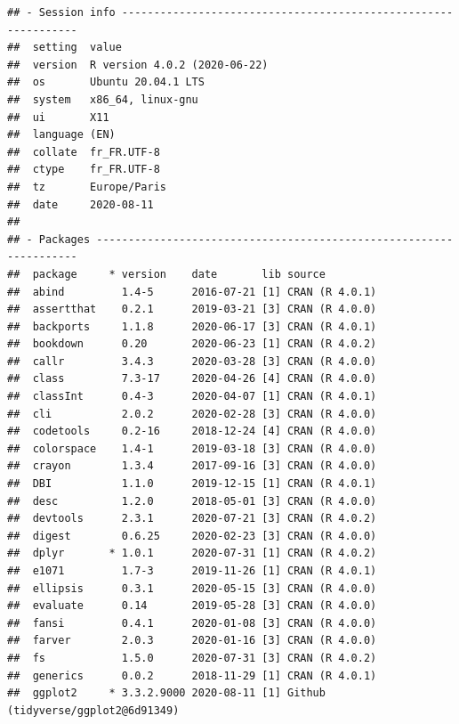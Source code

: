 \documentclass[
  french,
]{book}
\begin{document}
\begin{verbatim}
## - Session info ---------------------------------------------------------------
##  setting  value                       
##  version  R version 4.0.2 (2020-06-22)
##  os       Ubuntu 20.04.1 LTS          
##  system   x86_64, linux-gnu           
##  ui       X11                         
##  language (EN)                        
##  collate  fr_FR.UTF-8                 
##  ctype    fr_FR.UTF-8                 
##  tz       Europe/Paris                
##  date     2020-08-11                  
## 
## - Packages -------------------------------------------------------------------
##  package     * version    date       lib source                            
##  abind         1.4-5      2016-07-21 [1] CRAN (R 4.0.1)                    
##  assertthat    0.2.1      2019-03-21 [3] CRAN (R 4.0.0)                    
##  backports     1.1.8      2020-06-17 [3] CRAN (R 4.0.1)                    
##  bookdown      0.20       2020-06-23 [1] CRAN (R 4.0.2)                    
##  callr         3.4.3      2020-03-28 [3] CRAN (R 4.0.0)                    
##  class         7.3-17     2020-04-26 [4] CRAN (R 4.0.0)                    
##  classInt      0.4-3      2020-04-07 [1] CRAN (R 4.0.1)                    
##  cli           2.0.2      2020-02-28 [3] CRAN (R 4.0.0)                    
##  codetools     0.2-16     2018-12-24 [4] CRAN (R 4.0.0)                    
##  colorspace    1.4-1      2019-03-18 [3] CRAN (R 4.0.0)                    
##  crayon        1.3.4      2017-09-16 [3] CRAN (R 4.0.0)                    
##  DBI           1.1.0      2019-12-15 [1] CRAN (R 4.0.1)                    
##  desc          1.2.0      2018-05-01 [3] CRAN (R 4.0.0)                    
##  devtools      2.3.1      2020-07-21 [3] CRAN (R 4.0.2)                    
##  digest        0.6.25     2020-02-23 [3] CRAN (R 4.0.0)                    
##  dplyr       * 1.0.1      2020-07-31 [1] CRAN (R 4.0.2)                    
##  e1071         1.7-3      2019-11-26 [1] CRAN (R 4.0.1)                    
##  ellipsis      0.3.1      2020-05-15 [3] CRAN (R 4.0.0)                    
##  evaluate      0.14       2019-05-28 [3] CRAN (R 4.0.0)                    
##  fansi         0.4.1      2020-01-08 [3] CRAN (R 4.0.0)                    
##  farver        2.0.3      2020-01-16 [3] CRAN (R 4.0.0)                    
##  fs            1.5.0      2020-07-31 [3] CRAN (R 4.0.2)                    
##  generics      0.0.2      2018-11-29 [1] CRAN (R 4.0.1)                    
##  ggplot2     * 3.3.2.9000 2020-08-11 [1] Github (tidyverse/ggplot2@6d91349)

\end{verbatim}
\end{document}
